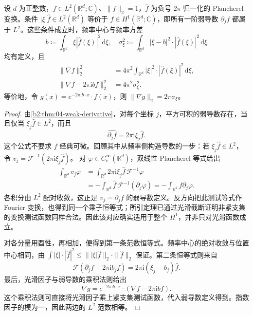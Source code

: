 \begin{proposition}[频率方差与弱梯度]\label{b2:prop:20-frequency-variance}
设 \(d\) 为正整数，\(f\in L^2(\mathbb R^d;\mathbb C)\)、\(\|f\|_2=1\)，\(\widehat f\) 为负号 \(2\pi\) 归一化的 Plancherel 变换。条件 \(|\xi|\widehat f\in L^2(\mathbb R^d)\) 等价于 \(f\in H^1(\mathbb R^d;\mathbb C)\)，即所有一阶弱导数 \(\partial_jf\) 都属于 \(L^2\)。这些条件成立时，频率中心与频率方差
\[
 b\coloneqq\int_{\mathbb R^d}\xi|\widehat f(\xi)|^2\,\mathrm d\xi,
 \quad
 \sigma_\xi^2\coloneqq
 \int_{\mathbb R^d}|\xi-b|^2\cdot|\widehat f(\xi)|^2\,\mathrm d\xi
\]
均有定义，且
\[
 \begin{aligned}
 \|\nabla f\|_2^2
   &=4\pi^2\int_{\mathbb R^d}|\xi|^2\cdot|\widehat f(\xi)|^2\,\mathrm d\xi,\\
 \|\nabla f-2\pi\mathrm i b f\|_2^2
   &=4\pi^2\sigma_\xi^2.
 \end{aligned}
\]
等价地，令 \(g(x)=e^{-2\pi\mathrm i b\cdot x}\cdot f(x)\)，则
\(\|\nabla g\|_2=2\pi\sigma_\xi\)。
\end{proposition}
\begin{proof}
由\cref{b2:thm:04-weak-derivative}，对每个坐标 \(j\)，平方可积的弱导数存在，当且仅当 \(\xi_j\widehat f\in L^2\)，而且
\[
 \widehat{\partial_jf}=2\pi\mathrm i\xi_j\widehat f.
\]
这个公式不要求 \(f\) 经典可微。回顾其中从频率侧构造导数的一步：若 \(\xi_j\widehat f\in L^2\)，令
\(v_j=\mathcal F^{-1}(2\pi\mathrm i\xi_j\widehat f)\)。
对 \(\varphi\in C_c^\infty(\mathbb R^d)\)，双线性 Plancherel 等式给出
\[
 \begin{aligned}
 \int_{\mathbb R^d}v_j\varphi
 &=\int_{\mathbb R^d}2\pi\mathrm i\xi_j\widehat f\,
                  \mathcal F^{-1}\varphi\\
 &=-\int_{\mathbb R^d}\widehat f\,
                  \mathcal F^{-1}(\partial_j\varphi)
 =-\int_{\mathbb R^d}f\partial_j\varphi.
 \end{aligned}
\]
各积分由 \(L^2\) 配对收敛，这正是 \(v_j=\partial_jf\) 的弱导数定义。反方向把此测试等式作 Fourier 变换，也得到同一个乘子恒等式；所引定理已通过光滑截断证明非紧支集的变换测试函数同样合法。因此该对应确实适用于整个 \(H^1\)，并非只对光滑函数成立。

对各分量用酉性，再相加，便得到第一条范数恒等式。频率中心的绝对收敛与位置中心相同，由
\(\int|\xi|\cdot|\widehat f|^2\leq
\bigl\||\xi|\widehat f\bigr\|_2\cdot\|\widehat f\|_2\)
保证。第二条恒等式则来自
\[
 \mathcal F(\partial_jf-2\pi\mathrm i b_jf)
 =2\pi\mathrm i(\xi_j-b_j)\widehat f.
\]
最后，光滑因子与弱导数的乘积法则给出
\[
 \nabla g
 =e^{-2\pi\mathrm i b\cdot x}\cdot
   (\nabla f-2\pi\mathrm i b f).
\]
这个乘积法则可直接将光滑因子乘上紧支集测试函数，代入弱导数定义得到。指数因子的模为一，因此两边的 \(L^2\) 范数相等。
\end{proof}

